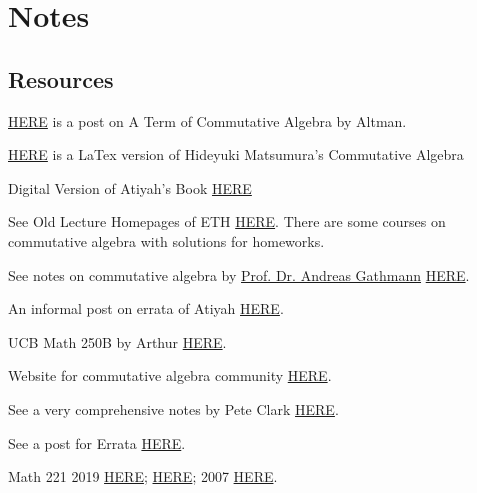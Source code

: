 \section{Notes}

\subsection{Resources}


\href{https://mathoverflow.net/questions/385312/latest-a-term-of-commutative-algebra-by-altman-and-kleiman}{HERE} is a post on A Term of Commutative Algebra by Altman.

\href{https://aareyanmanzoor.github.io/assets/matsumura-CA.pdf}{HERE} is a LaTex version of Hideyuki Matsumura's Commutative Algebra

Digital Version of Atiyah's Book \href{https://digitalcommons.unl.edu/cgi/viewcontent.cgi?article=1004&context=mathclass}{HERE}

See Old Lecture Homepages of ETH \href{https://www2.math.ethz.ch/education/bachelor/lectures.html}{HERE}. There are some courses on commutative algebra with solutions for homeworks.

See notes on commutative algebra by \href{https://math.rptu.de/en/wgs/agag/people/head/gathmann/}{Prof. Dr. Andreas Gathmann} \href{https://agag-gathmann.math.rptu.de/en/commalg.php}{HERE}.

An informal post on errata of Atiyah \href{https://mathoverflow.net/questions/42241/errata-for-atiyah-macdonald}{HERE}.

UCB Math 250B by Arthur \href{https://math.berkeley.edu/~ogus/Math_250B-2016/index.html}{HERE}.

Website for commutative algebra community \href{https://commalg.org}{HERE}.

See a very comprehensive notes by Pete Clark \href{http://alpha.math.uga.edu/%7Epete/integral.pdf}{HERE}.

See a post for Errata \href{https://mathoverflow.net/questions/42241/errata-for-atiyah-macdonald}{HERE}.

Math 221 2019 \href{https://people.math.harvard.edu/~bullery/math221/}{HERE}; \href{https://people.math.harvard.edu/~mpopa/221/index.html}{HERE}; 2007 \href{https://dept.math.lsa.umich.edu/~tfylam/Math221/Math221.html}{HERE}.


